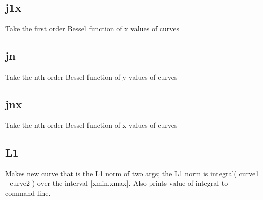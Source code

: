 \documentclass[letterpaper,10pt,english]{sphinxmanual}
\begin{document}
\subsection{j1x}
\label{\detokenize{math_operations:j1x}}
Take the first order Bessel function of x values of curves

\begin{sphinxVerbatim}[commandchars=\\\{\}]
\PYG{p}{[}\PYG{p}{]}  
\end{sphinxVerbatim}


\subsection{jn}
\label{\detokenize{math_operations:jn}}
Take the nth order Bessel function of y values of curves

\begin{sphinxVerbatim}[commandchars=\\\{\}]
\PYG{p}{[}\PYG{p}{]}   
\end{sphinxVerbatim}


\subsection{jnx}
\label{\detokenize{math_operations:jnx}}
Take the nth order Bessel function of x values of curves

\begin{sphinxVerbatim}[commandchars=\\\{\}]
\PYG{p}{[}\PYG{p}{]}   
\end{sphinxVerbatim}


\subsection{L1}
\label{\detokenize{math_operations:l1}}
Makes new curve that is the L1 norm of two args; the L1 norm is integral( \textbar{}curve1 - curve2\textbar{} ) over the interval {[}xmin,xmax{]}. Also prints value of integral to command-line.

\begin{sphinxVerbatim}[commandchars=\\\{\}]
\PYG{p}{[}\PYG{p}{]}    \PYG{p}{[} \PYG{p}{]}
\end{sphinxVerbatim}
\end{document}
